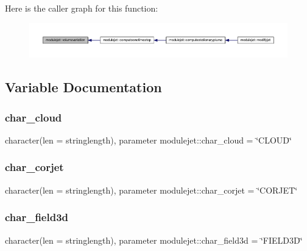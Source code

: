 Here is the caller graph for this function\+:\nopagebreak
\begin{figure}[H]
\begin{center}
\leavevmode
\includegraphics[width=350pt]{namespacemodulejet_abe8dc92537467b9dcd97c4a01b77f51c_icgraph}
\end{center}
\end{figure}


\subsection{Variable Documentation}
\mbox{\label{namespacemodulejet_ada08e627a6d079948c1b003fbb4123d3}} 
\subsubsection{\texorpdfstring{char\+\_\+cloud}{char\_cloud}}
{\footnotesize\ttfamily character(len = stringlength), parameter modulejet\+::char\+\_\+cloud = \char`\"{}C\+L\+O\+UD\char`\"{}\hspace{0.3cm}{\ttfamily [private]}}

\mbox{\label{namespacemodulejet_aaf2968de3c9e21de5bf36921280173ea}} 
\subsubsection{\texorpdfstring{char\+\_\+corjet}{char\_corjet}}
{\footnotesize\ttfamily character(len = stringlength), parameter modulejet\+::char\+\_\+corjet = \char`\"{}C\+O\+R\+J\+ET\char`\"{}\hspace{0.3cm}{\ttfamily [private]}}

\mbox{\label{namespacemodulejet_ab29798d11a7038ce6bed995f6906602b}} 
\subsubsection{\texorpdfstring{char\+\_\+field3d}{char\_field3d}}
{\footnotesize\ttfamily character(len = stringlength), parameter modulejet\+::char\+\_\+field3d = \char`\"{}F\+I\+E\+L\+D3D\char`\"{}\hspace{0.3cm}{\ttfamily [private]}}

